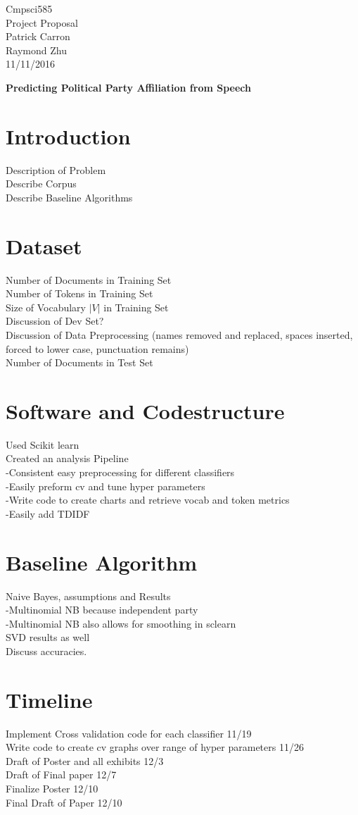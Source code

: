 \documentclass[a4paper, 11pt]{article}
\begin{document}
\noindent
Cmpsci585\\
Project Proposal\\
Patrick Carron \\
Raymond Zhu\\
11/11/2016 \\
\begin{center}

\textbf{Predicting Political Party Affiliation from Speech}
\end{center}
\section{Introduction}
Description of Problem\\
Describe Corpus\\
Describe Baseline Algorithms\\
\section{Dataset}
Number of Documents in Training Set\\
Number of Tokens in Training Set\\
Size of Vocabulary $|V|$ in Training Set\\
Discussion of Dev Set?\\
Discussion of Data Preprocessing (names removed and replaced, spaces inserted, forced to lower case, punctuation remains)\\
Number of Documents in Test Set\\
\section{Software and Codestructure}
Used Scikit learn\\
Created an analysis Pipeline\\
-Consistent easy preprocessing for different classifiers\\
-Easily preform cv and tune hyper parameters\\
-Write code to create charts and retrieve vocab and token metrics\\
-Easily add TDIDF\\
\section{Baseline Algorithm}
Naive Bayes, assumptions and Results\\
-Multinomial NB because independent party\\
-Multinomial NB also allows for smoothing in sclearn\\
SVD results as well\\
Discuss accuracies.\\
\section{Timeline}
Implement Cross validation code for each classifier 11/19\\
Write code to create cv graphs over range of hyper parameters 11/26\\
Draft of Poster and all exhibits 12/3\\
Draft of Final paper 12/7\\
Finalize Poster 12/10\\
Final Draft of Paper 12/10\\
\end{document}
